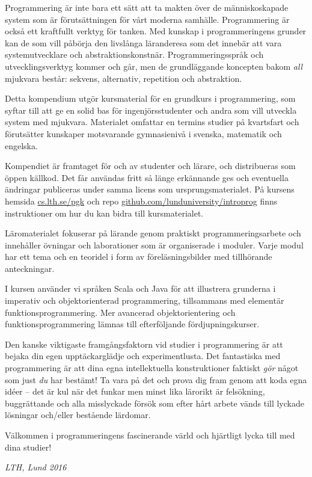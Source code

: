 


Programmering är inte bara ett sätt att ta makten över de människoskapade system som är förutsättningen för vårt moderna samhälle. Programmering är också ett kraftfullt verktyg för tanken. Med kunskap i programmeringens grunder kan de som vill påbörja den livslånga läranderesa som det innebär att vara systemutvecklare och abstraktionskonstnär. Programmeringsspråk och utvecklingsverktyg kommer och går, men de grundläggande koncepten bakom \emph{all} mjukvara består: sekvens, alternativ, repetition och abstraktion. 

Detta kompendium utgör kursmaterial för en grundkurs i programmering, som syftar till att ge en solid bas för ingenjörsstudenter och andra som vill utveckla system med mjukvara. Materialet omfattar en termins studier på kvartsfart och förutsätter kunskaper motsvarande gymnasienivå i svenska, matematik och engelska. 

Kompendiet är framtaget för och av studenter och lärare, och distribueras som öppen källkod. Det får användas fritt så länge erkännande ges och eventuella ändringar publiceras under samma licens som ursprungsmaterialet. På kursens hemsida \href{http://cs.lth.se/pgk}{cs.lth.se/pgk} och repo \href{http://github.com/lunduniversity/introprog}{github.com/lunduniversity/introprog} finns instruktioner om hur du kan bidra till kursmaterialet.

Läromaterialet fokuserar på lärande genom praktiskt programmeringsarbete och innehåller övningar och laborationer som är organiserade i moduler. Varje modul har ett tema och en teoridel i form av föreläsningsbilder med tillhörande anteckningar. 

I kursen använder vi språken Scala och Java för att illustrera grunderna i imperativ och objektorienterad programmering, tillsammans med elementär funktionsprogrammering. Mer avancerad objektorientering och funktionsprogrammering lämnas till efterföljande fördjupningskurser. 

Den kanske viktigaste framgångsfaktorn vid studier i programmering är att bejaka din egen upptäckarglädje och experimentlusta. Det fantastiska med programmering är att dina egna intellektuella konstruktioner faktiskt \emph{gör} något som just \emph{du} har bestämt! Ta vara på det och prova dig fram genom att koda egna idéer -- det är kul när det funkar men minst lika lärorikt är felsökning, buggrättande och alla misslyckade försök som efter hårt arbete vänds till lyckade lösningar och/eller bestående lärdomar. 

Välkommen i programmeringens fascinerande värld och hjärtligt lycka till med dina studier!

\vspace{2em}\noindent\emph{LTH, Lund 2016}


